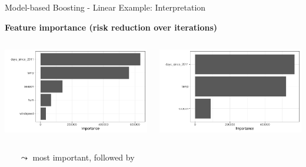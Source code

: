 \documentclass[11pt,compress,t,notes=noshow, aspectratio=169, xcolor=table]{beamer}
\begin{document}
\begin{frame}{Model-based Boosting - Linear Example: Interpretation}

\medskip
\textbf{Feature importance (risk reduction over iterations)}

\medskip

\begin{columns}[T, totalwidth=\linewidth]
\begin{column}{0.47\linewidth}
\includegraphics[width = \linewidth]{figure/compboost_pfi_base2.pdf}
\end{column}


\begin{column}{0.47\linewidth}
\includegraphics[width = \linewidth]{figure/compboost_pfi_base1.pdf}
\end{column}
\end{columns}

\bigskip

\begin{itemize}
    \item[$\leadsto$]  most important, followed by 
\end{itemize}

\end{frame}
\end{document}
